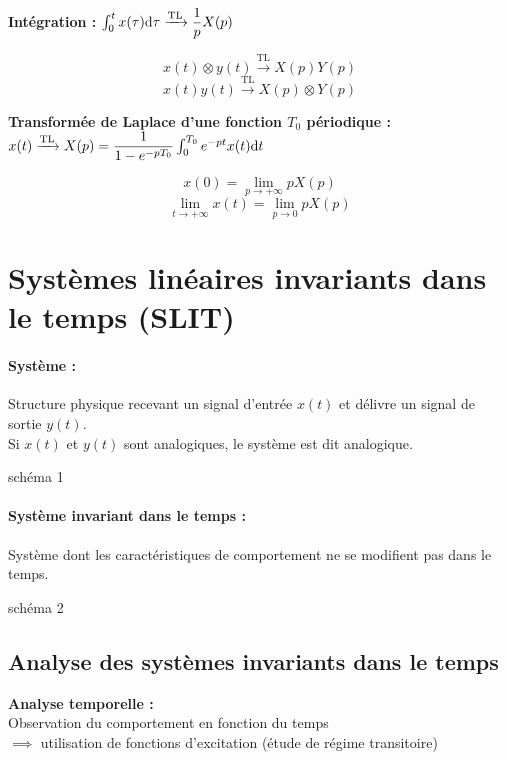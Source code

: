 \documentclass[a4paper,12pt]{report}
\begin{document}
\textbf{Intégration :} $\int_0^t x(\tau) \mathrm{d}\tau \xrightarrow{\mathrm{TL}} \dfrac{1}{p} X(p)$

\begin{defi}
    \[ x(t) \otimes y(t) \xrightarrow{\mathrm{TL}} X(p) Y(p) \]
    \[ x(t) y(t) \xrightarrow{\mathrm{TL}} X(p) \otimes Y(p) \]
\end{defi}

\textbf{Transformée de Laplace d'une fonction $T_0$ périodique :} $x(t) \xrightarrow{\mathrm{TL}} X(p) = \dfrac{1}{1-e^{-pT_0}} \int_0^{T_0} e^{-pt} x(t) \mathrm{d}t$

\begin{defi}
    \[ x(0) = \lim_{p \to +\infty} pX(p)\]
    \[ \lim_{t \to +\infty} x(t) = \lim_{p \to 0} pX(p) \]
\end{defi}

\section{Systèmes linéaires invariants dans le temps (SLIT)}

\begin{defi}
    \paragraph{Système :} Structure physique recevant un signal d'entrée $x(t)$ et délivre un signal de sortie $y(t)$. \\
    Si $x(t)$ et $y(t)$ sont analogiques, le système est dit analogique.

    {\Large schéma 1}

    \paragraph{Système invariant dans le temps :} Système dont les caractéristiques de comportement ne se modifient pas dans le temps.

    {\Large schéma 2}
\end{defi}

\subsection{Analyse des systèmes invariants dans le temps}

\textbf{Analyse temporelle :} \\
Observation du comportement en fonction du temps \\
$\implies$ utilisation de fonctions d'excitation (étude de régime transitoire)
\end{document}
